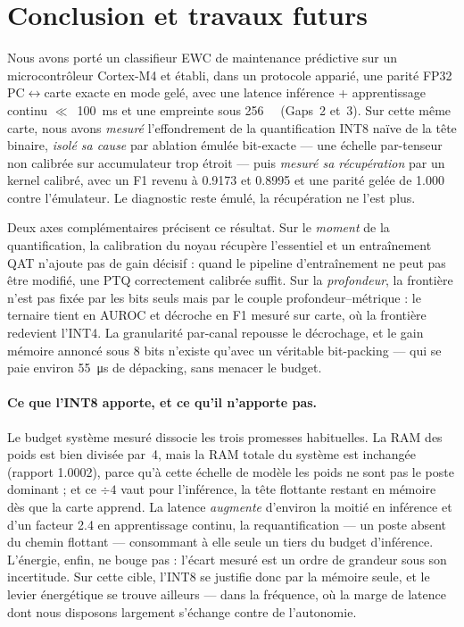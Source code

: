 \section{Conclusion et travaux futurs}
\label{sec:conclusion}

Nous avons porté un classifieur EWC de maintenance prédictive sur un microcontrôleur Cortex-M4 et établi,
dans un protocole apparié, une parité FP32 PC$\leftrightarrow$carte exacte en mode gelé, avec une latence
inférence + apprentissage continu $\ll$~\SI{100}{\milli\second} et une empreinte sous
\SI{256}{\kilo\byte} (Gaps~2 et~3). Sur cette même carte, nous avons \emph{mesuré} l'effondrement de la
quantification INT8 naïve de la tête binaire, \emph{isolé sa cause} par ablation émulée bit-exacte --- une
échelle par-tenseur non calibrée sur accumulateur trop étroit --- puis \emph{mesuré sa récupération} par un
kernel calibré, avec un F1 revenu à \num{0.9173} et \num{0.8995} et une parité gelée de \num{1.000} contre
l'émulateur. Le diagnostic reste émulé, la récupération ne l'est plus.

Deux axes complémentaires précisent ce résultat. Sur le \emph{moment} de la quantification, la calibration
du noyau récupère l'essentiel et un entraînement QAT n'ajoute pas de gain décisif : quand le pipeline
d'entraînement ne peut pas être modifié, une PTQ correctement calibrée suffit. Sur la \emph{profondeur}, la
frontière n'est pas fixée par les bits seuls mais par le couple profondeur--métrique : le ternaire tient en
AUROC et décroche en F1 mesuré sur carte, où la frontière redevient l'INT4. La granularité par-canal
repousse le décrochage, et le gain mémoire
annoncé sous 8 bits n'existe qu'avec un véritable bit-packing --- qui se paie environ
\SI{55}{\micro\second} de dépacking, sans menacer le budget.

\paragraph{Ce que l'INT8 apporte, et ce qu'il n'apporte pas.} Le budget système mesuré dissocie les trois
promesses habituelles. La RAM des poids est bien divisée par~4, mais la RAM totale du système est
inchangée (rapport \num{1.0002}), parce qu'à cette échelle de modèle les poids ne sont pas le poste
dominant ; et ce $\div 4$ vaut pour l'inférence, la tête flottante restant en mémoire dès que la carte
apprend. La latence \emph{augmente} d'environ la moitié en inférence et d'un facteur \num{2.4} en
apprentissage continu, la requantification --- un poste absent du chemin flottant --- consommant à elle
seule un tiers du budget d'inférence. L'énergie, enfin, ne bouge pas : l'écart mesuré
est un ordre de grandeur sous son incertitude. Sur cette cible, l'INT8 se justifie donc par la mémoire
seule, et le levier énergétique se trouve ailleurs --- dans la fréquence, où la marge de latence dont nous
disposons largement s'échange contre de l'autonomie.

